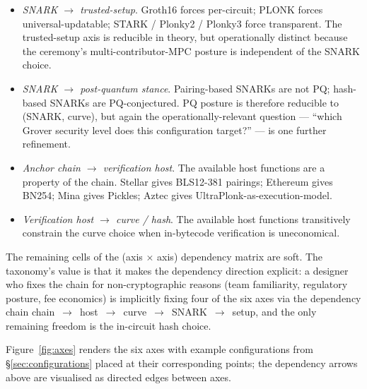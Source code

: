 \begin{itemize}
  \item \emph{SNARK $\to$ trusted-setup}. Groth16 forces per-circuit;
    PLONK forces universal-updatable; STARK / Plonky2 / Plonky3 force
    transparent. The trusted-setup axis is reducible in theory, but
    operationally distinct because the ceremony's
    multi-contributor-MPC posture is independent of the SNARK choice.
  \item \emph{SNARK $\to$ post-quantum stance}. Pairing-based SNARKs
    are not PQ; hash-based SNARKs are PQ-conjectured. PQ posture is
    therefore reducible to (SNARK, curve), but again the
    operationally-relevant question --- ``which Grover security level
    does this configuration target?'' --- is one further refinement.
  \item \emph{Anchor chain $\to$ verification host}. The available
    host functions are a property of the chain. Stellar gives
    BLS12-381 pairings; Ethereum gives BN254; Mina gives Pickles;
    Aztec gives UltraPlonk-as-execution-model.
  \item \emph{Verification host $\to$ curve / hash}. The available
    host functions transitively constrain the curve choice when
    in-bytecode verification is uneconomical.
\end{itemize}

The remaining cells of the (axis $\times$ axis) dependency matrix are
soft. The taxonomy's value is that it makes the dependency direction
explicit: a designer who fixes the chain for non-cryptographic reasons
(team familiarity, regulatory posture, fee economics) is implicitly
fixing four of the six axes via the dependency chain
chain~$\to$~host~$\to$~curve~$\to$~SNARK~$\to$~setup, and the only
remaining freedom is the in-circuit hash choice.

Figure~\ref{fig:axes} renders the six axes with example configurations
from \S\ref{sec:configurations} placed at their corresponding points;
the dependency arrows above are visualised as directed edges between
axes.


